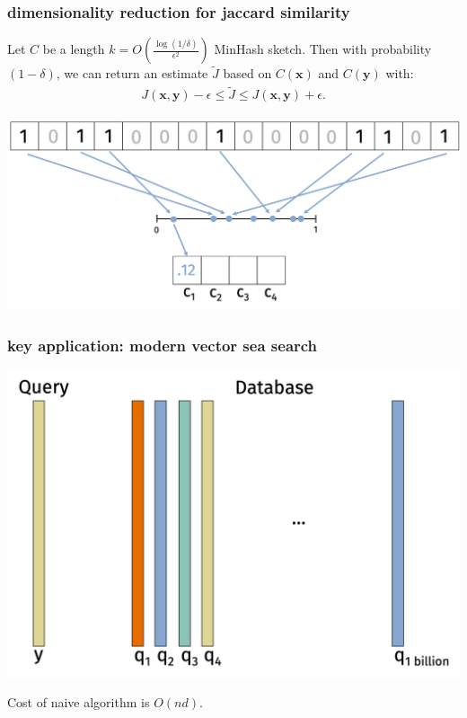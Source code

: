 \documentclass[compress]{beamer}
\newcommand{\bv}[1]{\mathbf{#1}}
\begin{document}
\begin{frame}
	\frametitle{dimensionality reduction for jaccard similarity}
	\begin{lemma}[MinHash]
		Let $C$ be a length $k = O\left(\frac{\log(1/\delta)}{\epsilon^2}\right)$ MinHash sketch. Then with probability $(1-\delta)$, we can return an estimate $\tilde{J}$ based on $C(\bv{x})$ and $C(\bv{y})$ with:
		\begin{align*}
			J(\bv{x},\bv{y}) - \epsilon \leq \tilde{J} \leq J(\bv{x},\bv{y}) + \epsilon.	
		\end{align*}
	\end{lemma}
	
	\begin{center}
		\includegraphics[width=.8\textwidth]{minHash1.png}	
	\end{center}
\end{frame}

\begin{frame}
	\frametitle{key application: modern vector sea search}
	\begin{center}
		\vspace{-.5em}
				\includegraphics[width=.8\textwidth]{vector_search_recap.png}
				\vspace{-.5em}
	\end{center}
	Cost of naive algorithm is $O(nd)$. 
\end{frame}
\end{document}
